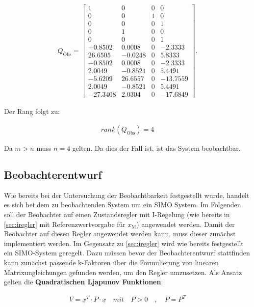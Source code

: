 \begin{align}
    Q_{\mathrm{Obs}} = 
    \begin{bmatrix}
        1 & 0 & 0 & 0 \\
        0 & 0 & 1 & 0 \\
        0 & 0 & 0 & 1 \\
        0 & 1 & 0 & 0 \\
        0 & 0 & 0 & 1 \\
        -0.8502 & 0.0008 & 0 & -2.3333 \\
       26.6505 & -0.0248 & 0 & 5.8333 \\
       -0.8502 & 0.0008 & 0 & -2.3333 \\
        2.0049 & -0.8521 & 0 & 5.4491 \\
       -5.6209 & 26.6557 & 0 & -13.7559 \\
        2.0049 & -0.8521 & 0 & 5.4491 \\
      -27.3408 & 2.0304 & 0 & -17.6849
    \end{bmatrix}.
\end{align}

Der Rang folgt zu:

\begin{align}
    rank(Q_{\mathrm{Obs}}) = 4
\end{align}

Da $m > n$ muss $n = 4$ gelten. Da dies der Fall ist, ist das System beobachtbar.

\subsection{Beobachterentwurf}

Wie bereits bei der Untersuchung der Beobachtbarkeit festgestellt wurde, handelt es sich bei dem zu beobachtenden System um ein SIMO System. Im Folgenden soll der Beobachter auf einen Zustandsregler mit I-Regelung (wie bereits in \autoref{sec:iregler} mit Referenzwertvorgabe für $x_{\mathrm{M}}$) angewendet werden. Damit der Beobachter auf diesen Regler angewendet werden kann, muss dieser zunächst implementiert werden. Im Gegensatz zu \autoref{sec:iregler} wird wie bereits festgestellt ein SIMO-System geregelt. Dazu müssen bevor der Beobachterentwurf stattfinden kann zunächst passende k-Faktoren über die Formulierung von linearen Matrixungleichungen gefunden werden, um den Regler umzusetzen. Als Ansatz gelten die \textbf{Quadratischen Ljapunov Funktionen}:

\begin{align}
    V = \underline{x}^T \cdot P \cdot \underline{x} \quad mit \quad P > 0 \quad , \quad P = P^T
\end{align}

